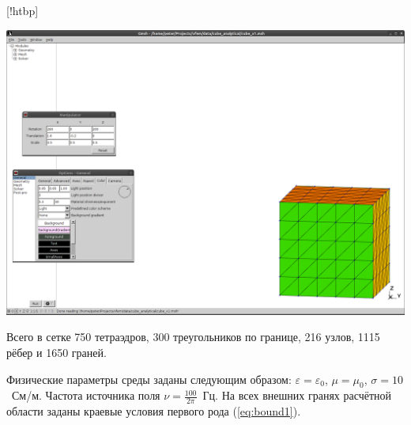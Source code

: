 \documentclass[a4paper,14pt]{article}
\makeatletter
\renewenvironment{figure}[1][\fps@figure]{
  \edef\@tempa{\noexpand\@float{figure}[#1]}
  \@tempa
  \addtocounter{foofigure}{1}
}{
  \end@float
}
\makeatother
\begin{document}
\begin{figure}[!htbp]
	\centering
	\includegraphics[trim=387mm 20mm 5mm 220mm,clip,scale=0.4]{verify/x1.png}
	\caption{конечноэлементная сетка для верификации}
	\label{fig:verify:x1}
\end{figure}

\noindent Всего в сетке 750 тетраэдров, 300 треугольников по границе, 216 узлов, 1115 рёбер и 1650 граней.

Физические параметры среды заданы следующим образом: $\varepsilon = \varepsilon_0$, $\mu = \mu_0$, $\sigma = 10$~См/м. Частота источника поля $\nu = \frac{100}{2 \pi}$~Гц. На всех внешних гранях расчётной области заданы краевые условия первого рода (\ref{eq:bound1}).

\end{document}
